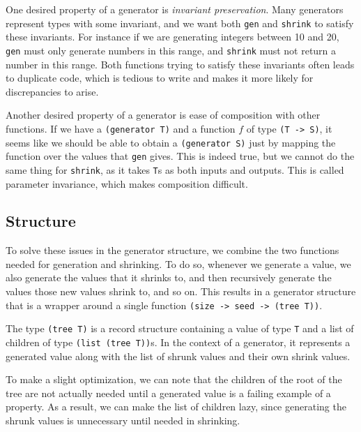 \documentclass{scrartcl}
\begin{document}
One desired property of a generator is \emph{invariant preservation}.
Many generators represent types with some invariant,
and we want both \verb|gen| and \verb|shrink| to satisfy these invariants.
For instance if we are generating integers between 10 and 20,
\verb|gen| must only generate numbers in this range,
and \verb|shrink| must not return a number in this range.
Both functions trying to satisfy these invariants
often leads to duplicate code, which is tedious to write and
makes it more likely for discrepancies to arise.

Another desired property of a generator is
ease of composition with other functions.
If we have a \verb|(generator T)| and a function \(f\) of type \verb|(T -> S)|,
it seems like we should be able to obtain a \verb|(generator S)| just by
mapping the function over the values that \verb|gen| gives.
This is indeed true, but we cannot do the same thing for \verb|shrink|,
as it takes \verb|T|s as both inputs and outputs.
This is called parameter invariance, which makes composition difficult.

\subsection{Structure}
To solve these issues in the generator structure,
we combine the two functions needed for generation and shrinking.
To do so, whenever we generate a value,
we also generate the values that it shrinks to,
and then recursively generate the values those new values shrink to, and so on.
This results in a generator structure that is a wrapper around a single
function \verb|(size -> seed -> (tree T))|.

The type \verb|(tree T)| is a record structure containing
  a value of type \verb|T| and
  a list of children of type \verb|(list (tree T))|s.
In the context of a generator, it represents
  a generated value
  along with the list of shrunk values and their own shrink values.

To make a slight optimization, we can note that the children of the root
of the tree are not actually needed until a generated value is
a failing example of a property.
As a result, we can make the list of children lazy,
since generating the shrunk values is unnecessary until needed in shrinking.


\end{document}
